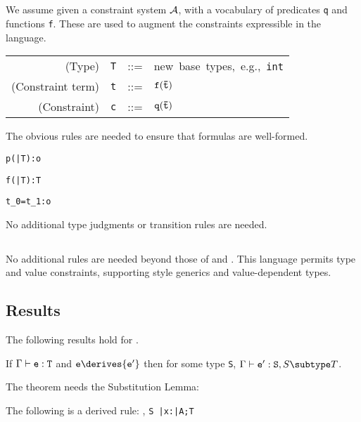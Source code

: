 \subsection{\FXD}
We assume given a constraint system $\cal A$, with a vocabulary of
predicates {\tt q} and functions {\tt f}. These are used to 
augment the constraints expressible in the language. 

\begin{tabular}{r@{\quad}rcl}
  (Type) & {\tt T} & {::=}& \mbox{new base types, e.g., {\tt int}}\\
  (Constraint term) & {\tt t} &{::=}& $\tt f(\bar{\tt t})$ \\
  (Constraint) & {\tt c} &{::=}& ${\tt q(\bar{\tt t})}$ 
\end{tabular}

\noindent
The obvious rules are needed to ensure that formulas are well-formed.

{
	{\Gamma \vdash \tt p(\bar{\tt T}):o}

	{\Gamma\tt \vdash \tt f(\bar{\tt T}):T}

	{\Gamma\tt \vdash t_0=t_1:o}
}
\noindent
No additional type judgments or transition rules are needed. 

\subsection{\FXGD} 

No additional rules are needed beyond those of \FXG{} and \FXD{}. This
language permits type and value constraints, supporting \FGJ{} style
generics and value-dependent types.


\subsection{Results}
The following results hold for \FXGD.

\begin{theorem} If $\Gamma \vdash {\tt e:T}$ and ${\tt e} \derives {\tt e'}$ then for some type {\tt S}, $\Gamma \vdash {\tt e':S},{S \subtype T}$.
\end{theorem}

The theorem needs the Substitution Lemma:
\begin{lemma} The following is a derived rule:
{\Gamma {}, {\tt S \subtype \bar{\tt x}:\bar{\tt A};T}}
\end{lemma}

